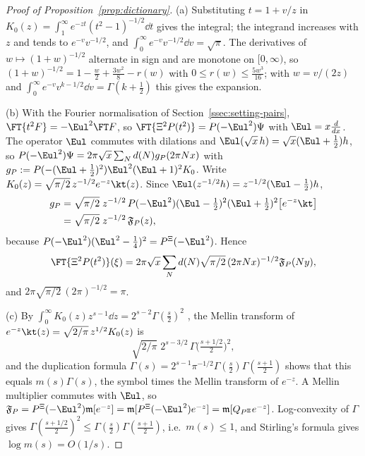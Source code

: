 \begin{proof}[Proof of Proposition~\textup{\ref{prop:dictionary}}]
(a) Substituting $t=1+v/z$ in $K_0(z)=\int_1^\infty e^{-zt}(t^2-1)^{-1/2}\dd t$ \cite[10.32.8]{DLMF} gives the
integral; the integrand increases with $z$ and tends to $e^{-v}v^{-1/2}$, and $\int_0^\infty e^{-v}v^{-1/2}\dd v=\sqrt\pi$.
The derivatives of $w\mapsto(1+w)^{-1/2}$ alternate in sign and are monotone on $[0,\infty)$, so
$(1+w)^{-1/2}=1-\frac w2+\frac{3w^2}{8}-r(w)$ with $0\le r(w)\le\frac{5w^3}{16}$; with $w=v/(2z)$ and
$\int_0^\infty e^{-v}v^{k-1/2}\dd v=\Gamma(k+\frac12)$ this gives the expansion.

(b) With the Fourier normalisation of Section~\ref{ssec:setting-pairs}, $\FT{t^2F}=-\Eul^2\FT F$, so $\FT{\Xi^2P(t^2)}=P(-\Eul^2)\Psi$ with
$\Eul=x\frac d{dx}$. The operator $\Eul$ commutes with dilations and $\Eul(\sqrt x\,h)=\sqrt x(\Eul+\frac12)h$, so
$P(-\Eul^2)\Psi=2\pi\sqrt x\sum_Nd(N)g_P(2\pi Nx)$ with $g_P:=P(-(\Eul+\frac12)^2)\Eul^2(\Eul+1)^2K_0$. Write
$K_0(z)=\sqrt{\pi/2}\,z^{-1/2}e^{-z}\kt(z)$. Since $\Eul(z^{-1/2}h)=z^{-1/2}(\Eul-\frac12)h$,
\[
  \begin{aligned}
  g_P&=\sqrt{\pi/2}\;z^{-1/2}\,P(-\Eul^2)(\Eul-\tfrac12)^2(\Eul+\tfrac12)^2\bigl[e^{-z}\kt\bigr]\\
  &=\sqrt{\pi/2}\;z^{-1/2}\,\mathfrak F_P(z),
  \end{aligned}
\]
because $P(-\Eul^2)(\Eul^2-\frac14)^2=P^{\Xi}(-\Eul^2)$. Hence
\[
  \FT{\Xi^2P(t^2)}(\xi)=2\pi\sqrt x\sum_Nd(N)\sqrt{\pi/2}\,(2\pi Nx)^{-1/2}\mathfrak F_P(Ny),
\]
and $2\pi\sqrt{\pi/2}\,(2\pi)^{-1/2}=\pi$.

(c) By $\int_0^\infty K_0(z)z^{s-1}\dd z=2^{s-2}\Gamma(\frac s2)^2$ \cite[10.43.19]{DLMF}, the Mellin transform of
$e^{-z}\kt(z)=\sqrt{2/\pi}\,z^{1/2}K_0(z)$ is
\[
  \sqrt{2/\pi}\;2^{s-3/2}\,\Gamma\bigl(\tfrac{s+1/2}2\bigr)^2,
\]
and the duplication
formula $\Gamma(s)=2^{s-1}\pi^{-1/2}\Gamma(\frac s2)\Gamma(\frac{s+1}2)$ shows that this equals $m(s)\Gamma(s)$, the
symbol times the Mellin transform of $e^{-z}$. A Mellin multiplier commutes with $\Eul$, so
$\mathfrak F_P=P^{\Xi}(-\Eul^2)\mathfrak m[e^{-z}]=\mathfrak m[P^{\Xi}(-\Eul^2)e^{-z}]=\mathfrak m[Q_{P^{\Xi}}e^{-z}]$.
Log-convexity of $\Gamma$ gives $\Gamma(\frac{s+1/2}2)^2\le\Gamma(\frac s2)\Gamma(\frac{s+1}2)$, i.e.\ $m(s)\le1$, and
Stirling's formula gives $\log m(s)=O(1/s)$.
\end{proof}

